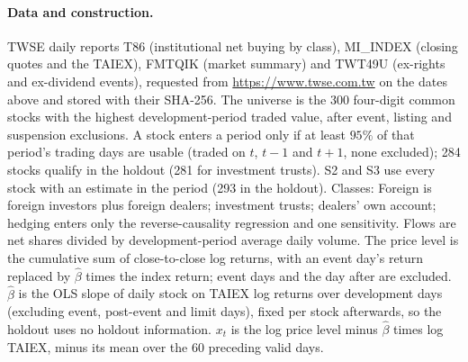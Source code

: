 \documentclass[12pt]{article}
\theoremstyle{definition}
\theoremstyle{remark}
\begin{document}
\paragraph{Data and construction.} TWSE daily reports T86 (institutional net buying by class), MI\_INDEX (closing quotes and the TAIEX), FMTQIK (market summary) and TWT49U (ex-rights and ex-dividend events), requested from \url{https://www.twse.com.tw} on the dates above and stored with their SHA-256. The universe is the 300 four-digit common stocks with the highest development-period traded value, after event, listing and suspension exclusions. A stock enters a period only if at least $95\%$ of that period's trading days are usable (traded on $t$, $t - 1$ and $t + 1$, none excluded); 284 stocks qualify in the holdout (281 for investment trusts). S2 and S3 use every stock with an estimate in the period (293 in the holdout). Classes: Foreign is foreign investors plus foreign dealers; investment trusts; dealers' own account; hedging enters only the reverse-causality regression and one sensitivity. Flows are net shares divided by development-period average daily volume. The price level is the cumulative sum of close-to-close log returns, with an event day's return replaced by $\hat\beta$ times the index return; event days and the day after are excluded. $\hat\beta$ is the OLS slope of daily stock on TAIEX log returns over development days (excluding event, post-event and limit days), fixed per stock afterwards, so the holdout uses no holdout information. $x_t$ is the log price level minus $\hat\beta$ times log TAIEX, minus its mean over the 60 preceding valid days.
\end{document}
